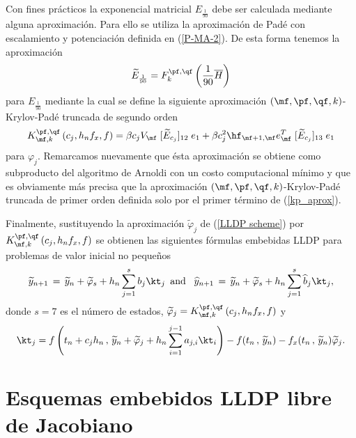 Con fines pr\'acticos la exponencial matricial $E_{\frac{1}{90}}$ debe ser calculada mediante alguna aproximaci\'on. Para ello se utiliza la aproximaci\'on de Padé con escalamiento y potenciación definida en (\ref{P-MA-2}). De esta forma tenemos la aproximación
\[\widetilde{E}_{\frac{1}{90}} = F_k^{\pf,\qf}\left(\frac{1}{90}\overline{H}\right) \]
para $E_{\frac{1}{90}}$ mediante la cual se define la siguiente aproximaci\'on $(\mf , \pf ,\qf , k)$-Krylov-Padé truncada de segundo orden
\begin{equation} \label{kp_aprox}
K_{\mf,k}^{\pf,\qf}\left(c_j,h_nf_x , f \right)=\beta c_jV_{\mf}\;[\widetilde{E}_{c_j}]_{12}\; e_1 + \beta c_j^{2}\hf_{\mf+1,\mf}e_\mf^T\;[\widetilde{E}_{c_j}]_{13}\; e_1
\end{equation}
para $\varphi_j$. Remarcamos nuevamente que ésta aproximación se obtiene como subproducto del algoritmo de Arnoldi con un costo computacional mínimo y que es obviamente más precisa que la aproximación $(\mf , \pf ,\qf , k)$-Krylov-Padé truncada de primer orden \cite{errorpade} definida solo por el primer término de (\ref{kp_aprox}). 

Finalmente, sustituyendo la aproximación $\widetilde{\varphi}_j$ de (\ref{LLDP scheme}) por $K_{\mf,k}^{\pf,\qf}\left(c_j,h_nf_x , f \right)$ se obtienen las siguientes fórmulas embebidas LLDP para problemas de valor inicial no pequeños
\begin{equation}
\widetilde{y}_{n+1}\,=\,\widetilde{y}_n+\widetilde{\varphi}_s+h_n \sum_{j=1}^{s}b_j \kt_j \,\,\, \text{and} \,\,\, \
\widehat{y}_{n+1}\,=\, \widetilde{y}_n+\widetilde{\varphi}_s+h_n \sum_{j=1}^{s}\widehat{b}_j \kt_j,
\label{LLDPK scheme}
\end{equation}
donde $s = 7$ es el número de estados, $ \widetilde{\varphi }_j =K_{\mf,k}^{\pf,\qf}\left(c_j,h_nf_x,f \right)$ y 
\[ \kt_j = f\left( t_n+c_jh_n\, , \, \widetilde{y}_n+\widetilde{\varphi}_j+h_n \sum_{i=1}^{j-1}a_{j,i}\kt_i \right) - f(t_n\, ,\, \widetilde{y}_n) - f_x(t_n\, , \, \widetilde{y}_n)\widetilde{\varphi}_j. \]

\section{Esquemas embebidos LLDP libre de Jacobiano\label{KRLOV-PADE-FJ}}

